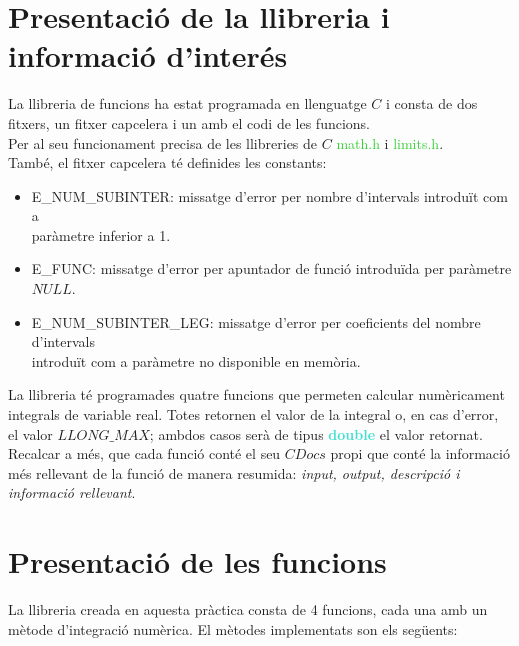 \documentclass[12pt]{article}
\begin{document}
\section{Presentació de la llibreria i informació d'interés}\label{pres.llib}
La llibreria de funcions ha estat programada en llenguatge $C$ i consta de dos fitxers, un fitxer capcelera i un amb el codi de les funcions.\\
Per al seu funcionament precisa de les llibreries de $C$ \textcolor{LimeGreen}{math.h} i \textcolor{LimeGreen}{limits.h}.\\
També, el fitxer capcelera té definides les constants:
\begin{itemize}
    \item \textcolor{Dandelion}{E\_NUM\_SUBINTER}: missatge d'error per nombre d'intervals introduït com a \\paràmetre inferior a 1.
    \item \textcolor{Dandelion}{E\_FUNC}: missatge d'error per apuntador de funció introduïda per paràmetre $NULL$.
    \item \textcolor{Dandelion}{E\_NUM\_SUBINTER\_LEG}: missatge d'error per coeficients del nombre d'intervals \\introduït com a paràmetre no disponible en memòria.
\end{itemize}
La llibreria té programades quatre funcions que permeten calcular numèricament integrals de variable real. Totes retornen el valor de la integral o, en cas d'error, el valor $LLONG\_MAX$; ambdos casos serà de tipus \textbf{\textcolor{Turquoise}{double}} el valor retornat. \\
Recalcar a més, que cada funció conté el seu $CDocs$ propi que conté la informació més rellevant de la funció de manera resumida: \textit{input, output, descripció i informació rellevant}.
\newpage
\section{Presentació de les funcions}\label{ap2}
La llibreria creada en aquesta pràctica consta de 4 funcions, cada una amb un mètode d'integració numèrica. El mètodes implementats son els següents:
\end{document}
